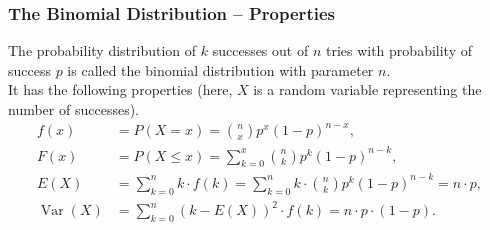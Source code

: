\documentclass[aspectratio=169,11pt,usenames,dvipsnames,handout]{beamer}
\DeclareMathOperator{\var}{Var}
\begin{document}
\begin{frame}
 \frametitle{The Binomial Distribution -- Properties}
 The probability distribution of $k$ successes out of $n$ tries with probability
 of success $p$ is called the \alert{binomial distribution} with parameter
 $n$.\\ \pause
 It has the following properties (here, $X$ is a random variable representing
 the number of successes).
 \vspace*{-1em}
 \begin{align*}
  f(x) &= P(X = x) = \binom{n}{x} p^{x} (1-p)^{n-x},\\
  F(x) &= P(X \leq x) = \sum_{k=0}^x \binom{n}{k} p^{k}(1-p)^{n-k},\\
  E(X) &= \sum_{k=0}^n k \cdot f(k) = \sum_{k=0}^n k \cdot \binom{n}{k}
  p^{k}(1-p)^{n-k} = n \cdot p,\\
  \var(X) &= \sum_{k=0}^n (k-E(X))^2 \cdot f(k) = n \cdot p \cdot (1-p).
 \end{align*}
\end{frame}
\end{document}
